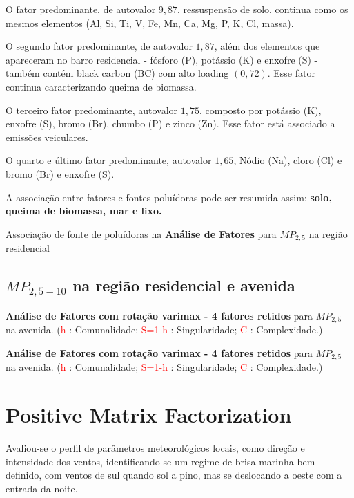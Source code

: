 O fator predominante, de autovalor $9,87$, ressuspensão de solo, continua 
como os mesmos elementos (Al, Si, Ti, V, Fe, Mn, Ca, Mg, P, K, Cl, massa).

O segundo fator predominante, de autovalor $1,87$, além dos elementos que 
apareceram no barro residencial - fósforo (P), potássio (K) e enxofre (S) -
também contém black carbon (BC) com alto loading $(0,72)$. 
Esse fator continua caracterizando queima de biomassa.

O terceiro fator predominante, autovalor $1,75$, composto por
potássio (K), enxofre (S), bromo (Br), chumbo (P) e zinco (Zn). 
Esse fator está associado a emissões veiculares. 

O quarto e último fator predominante, autovalor $1,65$, 
Nódio (Na), cloro (Cl) e bromo (Br) e enxofre (S).

A associação entre fatores e fontes poluídoras pode ser resumida
assim: \textbf{solo, queima de biomassa, mar e lixo.}

\begin{table}[H]
  \centering
  \caption{Associação de fonte de poluídoras na \textbf{Análise de Fatores}
         para $MP_{2,5}$ na região residencial}
  
\end{table}

\subsection{$MP_{2,5-10}$ na região residencial e avenida}

\begin{table}[H]
  \caption{\textbf{Análise de Fatores com rotação varimax - 4 fatores retidos} 
             para $MP_{2,5}$ na avenida.
           (\textcolor{red}{h} : Comunalidade; 
           \textcolor{red}{S=1-h} : Singularidade; 
           \textcolor{red}{C} : Complexidade.)}
  
\end{table}

\begin{table}[H]
  \caption{\textbf{Análise de Fatores com rotação varimax - 4 fatores retidos} 
             para $MP_{2,5}$ na avenida.
           (\textcolor{red}{h} : Comunalidade; 
           \textcolor{red}{S=1-h} : Singularidade; 
           \textcolor{red}{C} : Complexidade.)}
  
\end{table}

\section{Positive Matrix Factorization}
Avaliou-se o perfil de parâmetros meteorológicos locais, como direção e intensidade dos ventos, 
identificando-se um regime de brisa marinha bem definido, com ventos de sul quando sol a pino, mas se deslocando a oeste com a entrada da noite. 

